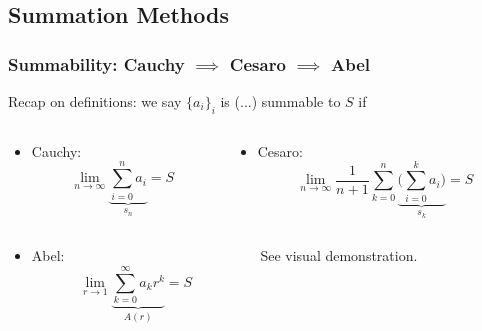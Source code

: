\documentclass{beamer}
\begin{document}

\subsection{Summation Methods}

\begin{frame}
\frametitle{Summability: Cauchy $\implies$ Cesaro $\implies$ Abel}

Recap on definitions: we say $ \{a_i\}_i $ is (...) summable to $S$ if 

\begin{columns}[c] %

\begin{column}{0.5\textwidth} %

\begin{itemize}
    \item Cauchy: 
    $$ \lim_{n \rightarrow \infty} \underbrace{ \sum_{i=0}^{n} a_i }_{s_n} = S $$ 
\end{itemize}

\end{column}
\begin{column}{0.5\textwidth} %

\begin{itemize}
    \item Cesaro: 
    $$ \lim_{n \rightarrow \infty} \frac{1}{n+1} \sum_{k=0}^{n} \underbrace{ \big( \sum_{i=0}^{k} a_i \big) }_{s_k} = S $$ 
\end{itemize}

\end{column}
\end{columns}

\begin{columns}[c] %

\begin{column}{0.5\textwidth} %

\begin{itemize}
    \item Abel: 
    $$ \lim_{r \rightarrow 1} \underbrace{ \sum_{k=0}^{\infty} a_k r^k }_{A(r)} = S $$ 
\end{itemize}

\end{column}
\begin{column}{0.5\textwidth} %

See visual demonstration. 

\end{column}
\end{columns}

\end{frame}
\end{document}
